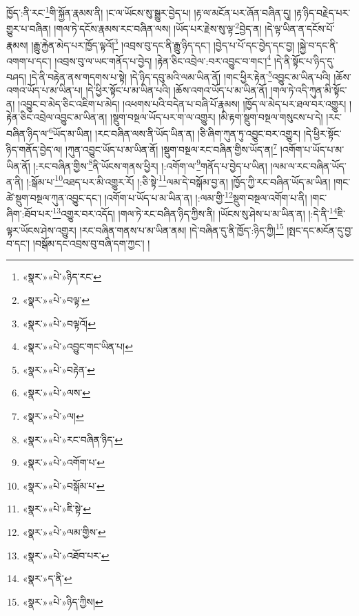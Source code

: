 ཁྱོད་:ནི་རང་\footnote{«སྣར་»«པེ་»ཉིད་རང་}གི་སྐྱོན་རྣམས་ནི། །ང་ལ་ཡོངས་སུ་སྒྱུར་བྱེད་པ། །རྟ་ལ་མངོན་པར་ཞོན་བཞིན་དུ། །རྟ་ཉིད་བརྗེད་པར་གྱུར་པ་བཞིན། །གལ་ཏེ་དངོས་རྣམས་རང་བཞིན་ལས། །ཡོད་པར་རྗེས་སུ་ལྟ་\footnote{«སྣར་»«པེ་»བལྟ་}བྱེད་ན། །དེ་ལྟ་ཡིན་ན་དངོས་པོ་རྣམས། །རྒྱུ་རྐྱེན་མེད་པར་ཁྱོད་ལྟའོ།\footnote{«སྣར་»«པེ་»བལྟའོ།} །འབྲས་བུ་དང་ནི་རྒྱུ་ཉིད་དང་། །བྱེད་པ་པོ་དང་བྱེད་དང་བྱ། །སྐྱེ་བ་དང་ནི་འགག་པ་དང་། །འབྲས་བུ་ལ་ཡང་གནོད་པ་བྱེད། །རྟེན་ཅིང་འབྲེལ་:བར་འབྱུང་བ་གང་།\footnote{«སྣར་»«པེ་»འབྱུང་གང་ཡིན་པ།} །དེ་ནི་སྟོང་པ་ཉིད་དུ་བཤད། །དེ་ནི་བརྟེན་ནས་གདགས་པ་སྟེ། །དེ་ཉིད་དབུ་མའི་ལམ་ཡིན་ནོ། །གང་ཕྱིར་རྟེན་\footnote{«སྣར་»«པེ་»བརྟེན་}འབྱུང་མ་ཡིན་པའི། །ཆོས་འགའ་ཡོད་པ་མ་ཡིན་པ། །དེ་ཕྱིར་སྟོང་པ་མ་ཡིན་པའི། །ཆོས་འགའ་ཡོད་པ་མ་ཡིན་ནོ། །གལ་ཏེ་འདི་ཀུན་མི་སྟོང་ན། །འབྱུང་བ་མེད་ཅིང་འཇིག་པ་མེད། །འཕགས་པའི་བདེན་པ་བཞི་པོ་རྣམས། །ཁྱོད་ལ་མེད་པར་ཐལ་བར་འགྱུར། །རྟེན་ཅིང་འབྲེལ་འབྱུང་མ་ཡིན་ན། །སྡུག་བསྔལ་ཡོད་པར་ག་ལ་འགྱུར། །མི་རྟག་སྡུག་བསྔལ་གསུངས་པ་དེ། །རང་བཞིན་ཉིད་ལ་\footnote{«སྣར་»«པེ་»ལས་}ཡོད་མ་ཡིན། །རང་བཞིན་ལས་ནི་ཡོད་ཡིན་ན། །ཅི་ཞིག་ཀུན་ཏུ་འབྱུང་བར་འགྱུར། །དེ་ཕྱིར་སྟོང་ཉིད་གནོད་བྱེད་ལ། །ཀུན་འབྱུང་ཡོད་པ་མ་ཡིན་ནོ། །སྡུག་བསྔལ་རང་བཞིན་གྱིས་ཡོད་ན།\footnote{«སྣར་»«པེ་»ལ།} །འགོག་པ་ཡོད་པ་མ་ཡིན་ནོ། །:རང་བཞིན་གྱིས་\footnote{«སྣར་»«པེ་»རང་བཞིན་ཉིད་}ནི་ཡོངས་གནས་ཕྱིར། །:འགོག་ལ་\footnote{«སྣར་»«པེ་»འགོག་པ་}གནོད་པ་བྱེད་པ་ཡིན། །ལམ་ལ་རང་བཞིན་ཡོད་ན་ནི། །:སྒོམ་པ་\footnote{«སྣར་»«པེ་»བསྒོམ་པ་}འཐད་པར་མི་འགྱུར་རོ། །:ཅི་སྟེ་\footnote{«སྣར་»«པེ་»ཇི་སྟེ་}ལམ་དེ་བསྒོམ་བྱ་ན། །ཁྱོད་ཀྱི་རང་བཞིན་ཡོད་མ་ཡིན། །གང་ཚེ་སྡུག་བསྔལ་ཀུན་འབྱུང་དང་། །འགོག་པ་ཡོད་པ་མ་ཡིན་ན། །:ལམ་གྱི་\footnote{«སྣར་»«པེ་»ལམ་གྱིས་}སྡུག་བསྔལ་འགོག་པ་ནི། །གང་ཞིག་:ཐོབ་པར་\footnote{«སྣར་»«པེ་»འཐོབ་པར་}འགྱུར་བར་འདོད། །གལ་ཏེ་རང་བཞིན་ཉིད་ཀྱིས་ནི། །ཡོངས་སུ་ཤེས་པ་མ་ཡིན་ན། །:དེ་ནི་\footnote{«སྣར་»ད་ནི་}ཇི་ལྟར་ཡོངས་ཤེས་འགྱུར། །རང་བཞིན་གནས་པ་མ་ཡིན་ནམ། །དེ་བཞིན་དུ་ནི་ཁྱོད་:ཉིད་ཀྱི།\footnote{«སྣར་»«པེ་»ཉིད་ཀྱིས།} །སྤང་དང་མངོན་དུ་བྱ་བ་དང་། །བསྒོམ་དང་འབྲས་བུ་བཞི་དག་ཀྱང་། །
